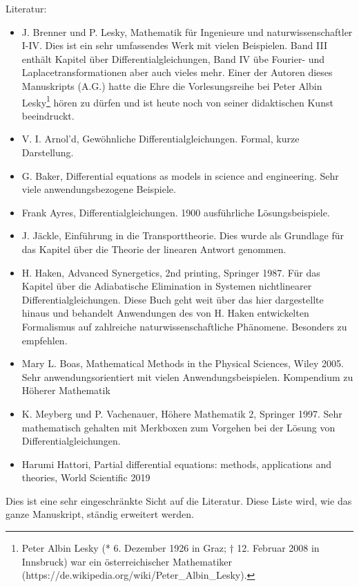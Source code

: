 \documentclass[a4paper,12pt]{book}%
\begin{document}
Literatur:
\begin{itemize}
  \item J. Brenner und P. Lesky, Mathematik für Ingenieure und
    naturwissenschaftler I-IV. Dies ist ein sehr umfassendes Werk mit vielen
    Beispielen. Band III enthält Kapitel über Differentialgleichungen, Band IV
    übe Fourier- und Laplacetransformationen aber auch vieles mehr. Einer der
    Autoren dieses Manuskripts (A.G.) hatte die Ehre die Vorlesungsreihe bei
    Peter Albin Lesky\footnote{Peter Albin Lesky (* 6. Dezember 1926 in Graz; †
    12. Februar 2008 in Innsbruck) war ein österreichischer Mathematiker
    (https://de.wikipedia.org/wiki/Peter\_Albin\_Lesky). } hören zu dürfen und ist
    heute noch von seiner didaktischen Kunst beeindruckt.
  \item V. I. Arnol'd, Gewöhnliche Differentialgleichungen. Formal, kurze
    Darstellung.
  \item G. Baker, Differential equations as models in science and engineering.
    Sehr viele anwendungsbezogene Beispiele.
  \item Frank Ayres, Differentialgleichungen. 1900 ausführliche Lösungsbeispiele.
  \item J. Jäckle, Einführung in die Transporttheorie. Dies wurde als Grundlage
    für das Kapitel über die Theorie der linearen Antwort genommen.
  \item H. Haken, Advanced Synergetics, 2nd printing, Springer 1987. Für das
    Kapitel über die Adiabatische Elimination in Systemen nichtlinearer
    Differentialgleichungen. Diese Buch geht weit über das hier dargestellte
    hinaus und behandelt Anwendungen des von H. Haken entwickelten Formalismus
    auf zahlreiche naturwissenschaftliche Phänomene. Besonders zu empfehlen.
  \item Mary L. Boas,  Mathematical Methods in the Physical Sciences, Wiley
    2005. Sehr anwendungsorientiert mit vielen Anwendungsbeispielen.
    Kompendium zu Höherer Mathematik 
  \item K. Meyberg und P. Vachenauer, Höhere Mathematik 2, Springer 1997.  Sehr
    mathematisch gehalten mit Merkboxen zum Vorgehen bei der Lösung von
    Differentialgleichungen. 
  \item Harumi Hattori, Partial differential equations: methods, applications
    and theories, World Scientific 2019
\end{itemize}
Dies ist eine sehr eingeschränkte Sicht auf die Literatur. Diese Liste wird,
wie das ganze Manuskript, ständig erweitert werden.
\newpage
\tableofcontents
\newpage 
\mainmatter













%
\begin{appendices}
\noappendicestocpagenum
\renewcommand\appendixtocname{Anhang}
\renewcommand\appendixpagename{Anhang}


%
\end{appendices}
\end{document}
